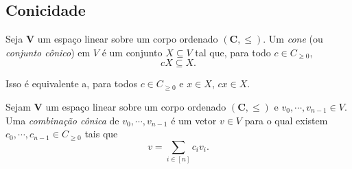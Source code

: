 \begin{proposition}
\begin{enumerate}

	\end{enumerate}
\end{proposition}







\subsection{Conicidade}

\begin{definition}[Cone]
Seja $\bm V$ um espaço linear sobre um corpo ordenado $(\bm C,\leq)$. Um \emph{cone} (ou  \emph{conjunto cônico}) em $V$ é um conjunto $X \subseteq V$ tal que, para todo $c \in C_{\geq 0}$,
	\begin{equation*}
	cX \subseteq X.
	\end{equation*}
\end{definition}

Isso é equivalente a, para todos $c \in C_{\geq 0}$ e $x \in X$, $cx \in X$.

\begin{definition}
Sejam $\bm V$ um espaço linear sobre um corpo ordenado $(\bm C,\leq)$ e $v_0,\cdots,v_{n-1} \in V$. Uma \emph{combinação cônica} de $v_0,\cdots,v_{n-1}$ é um vetor $v \in V$ para o qual existem $c_0,\cdots,c_{n-1} \in C_{\geq 0}$ tais que
	\begin{equation*}
	v = \sum_{i \in [n]} c_iv_i.
	\end{equation*}
\end{definition}

